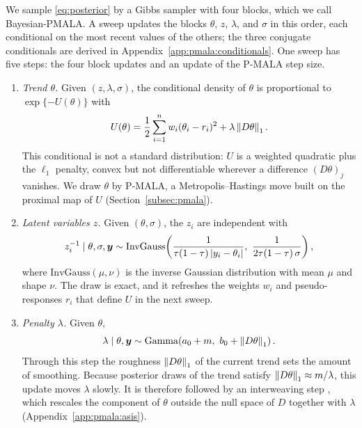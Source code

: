 We sample \eqref{eq:posterior} by a Gibbs sampler with four blocks, which we call Bayesian-PMALA. A sweep updates the blocks $\theta$, $z$, $\lambda$, and $\sigma$ in this order, each conditional on the most recent values of the others; the three conjugate conditionals are derived in Appendix~\ref{app:pmala:conditionals}. One sweep has five steps: the four block updates and an update of the P-MALA step size.
\begin{enumerate}
    \item \emph{Trend $\theta$.} Given $(z, \lambda, \sigma)$, the conditional density of $\theta$ is proportional to $\exp\{-U(\theta)\}$ with
    \begin{equation}
        U(\theta) = \frac{1}{2}\sum_{i=1}^n w_i (\theta_i - r_i)^2 + \lambda \left\lVert D\theta\right\rVert_1 .
        \label{eq:Utheta}
    \end{equation}
    This conditional is not a standard distribution: $U$ is a weighted quadratic plus the $\ell_1$ penalty, convex but not differentiable wherever a difference $(D\theta)_j$ vanishes. We draw $\theta$ by P-MALA, a Metropolis--Hastings move built on the proximal map of $U$ (Section~\ref{subsec:pmala}).
    \item \emph{Latent variables $z$.} Given $(\theta, \sigma)$, the $z_i$ are independent with
    \begin{equation}
        z_i^{-1} \mid \theta, \sigma, \bm{y} \sim \mathrm{InvGauss}\!\left(\frac{1}{\tau(1-\tau)\,|y_i - \theta_i|},\ \frac{1}{2\tau(1-\tau)\,\sigma}\right),
        \label{eq:zupdate}
    \end{equation}
    where $\mathrm{InvGauss}(\mu, \nu)$ is the inverse Gaussian distribution with mean $\mu$ and shape $\nu$. The draw is exact, and it refreshes the weights $w_i$ and pseudo-responses $r_i$ that define $U$ in the next sweep.
    \item \emph{Penalty $\lambda$.} Given $\theta$,
    \begin{equation}
        \lambda \mid \theta, \bm{y} \sim \mathrm{Gamma}\!\left(a_0 + m,\ b_0 + \left\lVert D\theta\right\rVert_1\right).
        \label{eq:lambdaupdate}
    \end{equation}
    Through this step the roughness $\left\lVert D\theta\right\rVert_1$ of the current trend sets the amount of smoothing. Because posterior draws of the trend satisfy $\left\lVert D\theta\right\rVert_1 \approx m/\lambda$, this update moves $\lambda$ slowly. It is therefore followed by an interweaving step \citep{yu2011center}, which rescales the component of $\theta$ outside the null space of $D$ together with $\lambda$ (Appendix~\ref{app:pmala:asis}).

\end{enumerate}
